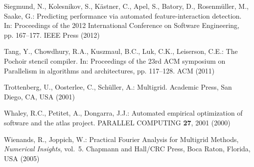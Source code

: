 \documentclass[onecolumn]{svjour3}
\begin{document}
\begin{thebibliography}{10}
Siegmund, N., Kolesnikov, S., K{\"a}stner, C., Apel, S., Batory, D.,
  Rosenm{\"u}ller, M., Saake, G.: Predicting performance via automated
  feature-interaction detection.
\newblock In: Proceedings of the 2012 International Conference on Software
  Engineering, pp. 167--177. IEEE Press (2012)

Tang, Y., Chowdhury, R.A., Kuszmaul, B.C., Luk, C.K., Leiserson, C.E.: The
  {P}ochoir stencil compiler.
\newblock In: Proceedings of the 23rd ACM symposium on Parallelism in
  algorithms and architectures, pp. 117--128. ACM (2011)

Trottenberg, U., Oosterlee, C., Sch{\"u}ller, A.: Multigrid.
\newblock Academic Press, San Diego, CA, USA (2001)

Whaley, R.C., Petitet, A., Dongarra, J.J.: Automated empirical optimization of
  software and the atlas project.
\newblock PARALLEL COMPUTING \textbf{27}, 2001 (2000)

Wienands, R., Joppich, W.: Practical {Fourier} Analysis for Multigrid Methods,
  \emph{Numerical Insights}, vol.~5.
\newblock Chapmann and Hall/CRC Press, Boca Raton, Florida, USA (2005)

\end{thebibliography}

 
\end{document}
